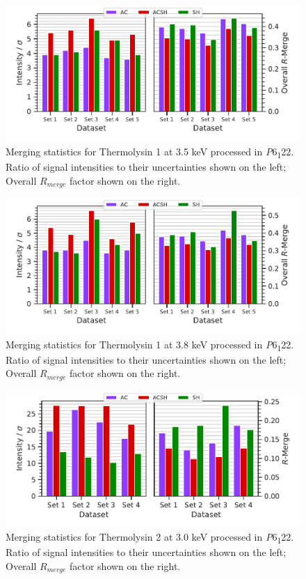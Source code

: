 \begin{figure}
    \centering
    \includegraphics{plots/exp1/tlys_9_P6122/3p5_stats_grid.pdf}
    \caption{Merging statistics for Thermolysin 1 at 3.5 \unit{keV} processed in \textit{P}6\textsubscript{1}22. Ratio of signal intensities to their uncertainties shown on the left; Overall $R_{merge}$ factor shown on the right.}
    \label{fig:tlys_9_3p5}
\end{figure}

\begin{figure}
    \centering
    \includegraphics{plots/exp1/tlys_9_P6122/3p8_stats_grid.pdf}
    \caption{Merging statistics for Thermolysin 1 at 3.8 \unit{keV} processed in \textit{P}6\textsubscript{1}22. Ratio of signal intensities to their uncertainties shown on the left; Overall $R_{merge}$ factor shown on the right.}
    \label{fig:tlys_9_3p8}
\end{figure}


\begin{figure}
    \centering
    \includegraphics{plots/exp1/tlys_2_P6122/3p0_stats_grid.pdf}
    \caption{Merging statistics for Thermolysin 2 at 3.0 \unit{keV} processed in \textit{P}6\textsubscript{1}22. Ratio of signal intensities to their uncertainties shown on the left; Overall $R_{merge}$ factor shown on the right.}
    \label{fig:tlys_2_3p0}
\end{figure}

